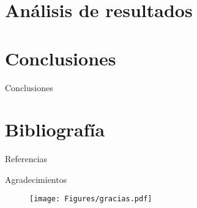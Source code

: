 \documentclass[10pt]{beamer}
\begin{document}

\section{Análisis de resultados}


\section{Conclusiones}

\begin{frame}{Conclusiones}

    
\end{frame}

\section{Bibliografía}

\begin{frame}{Referencias}




\end{frame}

\begin{frame}{Agradecimientos}

\begin{figure}[h]
\centering
\texttt{[image: Figures/gracias.pdf]}

\label{train_test}
\end{figure}

\end{frame}


\end{document}
